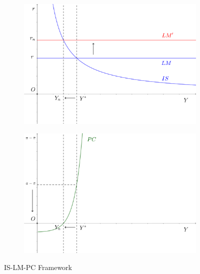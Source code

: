 \documentclass[12pt]{article}
\begin{document}
  \begin{figure}[htbp]
    \centering
    \begin{subfigure}[t]{0.6\textwidth}
      \centering
      \includegraphics[width=\linewidth]{islmpc01.png}
    \end{subfigure}\hfill
    \begin{subfigure}[t]{0.6\textwidth}
      \centering
      \includegraphics[width=\linewidth]{islmpc02.png}
    \end{subfigure}
    \caption{IS-LM-PC Framework}
    \label{fig:is-lm-pc}
  \end{figure}
\end{document}
